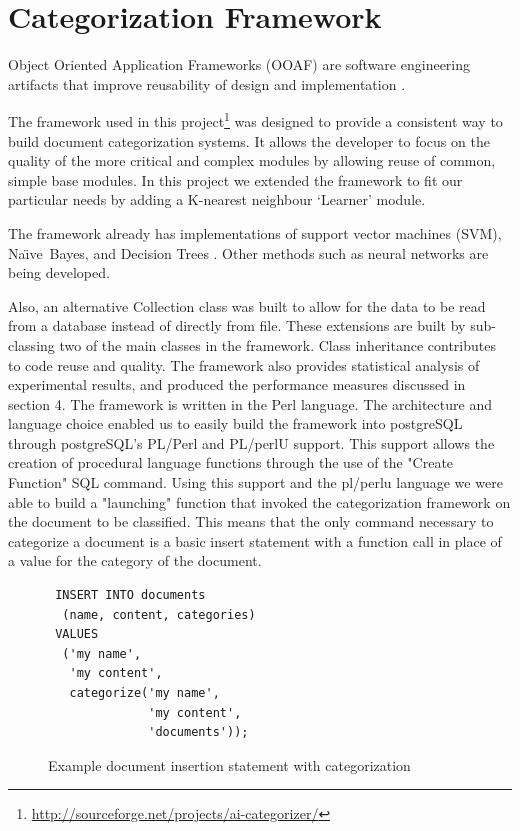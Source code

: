 \documentclass[twocolumn]{article}
\newcommand{\naive}{Na\"\i ve}
\begin{document}
\section{Categorization Framework}

Object Oriented Application Frameworks (OOAF) are software engineering artifacts 
that improve reusability of design and implementation \cite{fayad:97, fayad:99}.

The framework used in this project\footnote{\url{http://sourceforge.net/projects/ai-categorizer/}}
was designed to provide a 
consistent way to build document categorization systems.\cite{williams:02}  It allows the developer to 
focus on the quality of the more critical and complex modules by allowing reuse of 
common, simple base modules. In this project we extended the framework to fit our 
particular needs by adding a K-nearest neighbour `Learner' module. 

The framework already has implementations of support vector machines (SVM), 
\naive\ Bayes, and Decision Trees \cite{yang:99, sebastiani:02}. Other methods such 
as neural networks \cite{calvo:00, calvo:01} are being developed.

Also, an alternative Collection class was built to allow for the data to be read from a 
database instead of directly from file. These extensions are built by sub-classing two 
of the main classes in the framework. Class inheritance contributes to code reuse and 
quality. The framework also provides statistical analysis of experimental results, and 
produced the performance measures discussed in section 4. The framework is written 
in the Perl language. The architecture and language choice enabled us to easily build the 
framework into postgreSQL through postgreSQL's PL/Perl and PL/perlU support. 
This support allows the creation of procedural language functions through the use of 
the "Create Function" SQL command. Using this support and the pl/perlu language 
we were able to build a "launching" function that invoked the categorization 
framework on the document to be classified. This means that the only command 
necessary to categorize a document is a basic insert statement with a function call in 
place of a value for the category of the document.

\begin{figure}
\begin{verbatim}
 INSERT INTO documents
  (name, content, categories) 
 VALUES
  ('my name',
   'my content',
   categorize('my name',
              'my content',
              'documents'));
\end{verbatim}
\caption{Example document insertion statement with categorization}
\label{sql-insert}
\end{figure}
\end{document}
